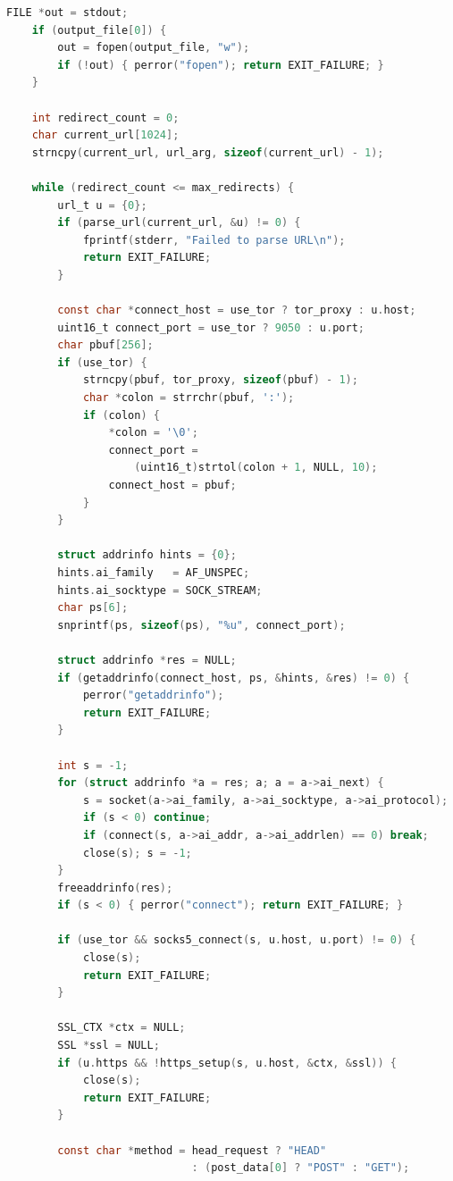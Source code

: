 \begin{lstlisting}[style=newcode,language=C,firstnumber=last]
    FILE *out = stdout;
    if (output_file[0]) {
        out = fopen(output_file, "w");
        if (!out) { perror("fopen"); return EXIT_FAILURE; }
    }

    int redirect_count = 0;
    char current_url[1024];
    strncpy(current_url, url_arg, sizeof(current_url) - 1);

    while (redirect_count <= max_redirects) {
        url_t u = {0};
        if (parse_url(current_url, &u) != 0) {
            fprintf(stderr, "Failed to parse URL\n");
            return EXIT_FAILURE;
        }

        const char *connect_host = use_tor ? tor_proxy : u.host;
        uint16_t connect_port = use_tor ? 9050 : u.port;
        char pbuf[256];
        if (use_tor) {
            strncpy(pbuf, tor_proxy, sizeof(pbuf) - 1);
            char *colon = strrchr(pbuf, ':');
            if (colon) {
                *colon = '\0';
                connect_port =
                    (uint16_t)strtol(colon + 1, NULL, 10);
                connect_host = pbuf;
            }
        }

        struct addrinfo hints = {0};
        hints.ai_family   = AF_UNSPEC;
        hints.ai_socktype = SOCK_STREAM;
        char ps[6];
        snprintf(ps, sizeof(ps), "%u", connect_port);

        struct addrinfo *res = NULL;
        if (getaddrinfo(connect_host, ps, &hints, &res) != 0) {
            perror("getaddrinfo");
            return EXIT_FAILURE;
        }

        int s = -1;
        for (struct addrinfo *a = res; a; a = a->ai_next) {
            s = socket(a->ai_family, a->ai_socktype, a->ai_protocol);
            if (s < 0) continue;
            if (connect(s, a->ai_addr, a->ai_addrlen) == 0) break;
            close(s); s = -1;
        }
        freeaddrinfo(res);
        if (s < 0) { perror("connect"); return EXIT_FAILURE; }

        if (use_tor && socks5_connect(s, u.host, u.port) != 0) {
            close(s);
            return EXIT_FAILURE;
        }

        SSL_CTX *ctx = NULL;
        SSL *ssl = NULL;
        if (u.https && !https_setup(s, u.host, &ctx, &ssl)) {
            close(s);
            return EXIT_FAILURE;
        }

        const char *method = head_request ? "HEAD"
                             : (post_data[0] ? "POST" : "GET");


\end{lstlisting}
